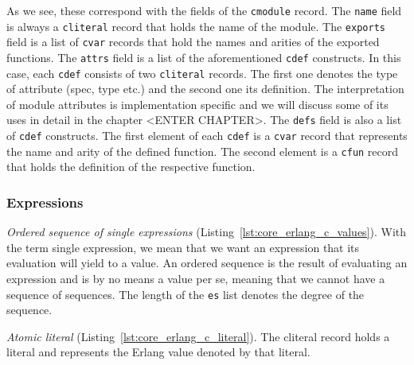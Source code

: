 As we see, these correspond with the fields of the \texttt{c\textunderscore module} record. The \texttt{name}
field is always a \texttt{c\textunderscore literal} record that holds the name of the module. The
\texttt{exports} field is a list of \texttt{c\textunderscore var} records that hold the names and arities of the
exported functions. The \texttt{attrs} field is a list of the aforementioned \texttt{c\textunderscore def}
constructs. In this case, each \texttt{c\textunderscore def} consists of two \texttt{c\textunderscore literal} records. The
first one denotes the type of attribute (spec, type etc.) and the second one
its definition. The interpretation of module attributes is implementation
specific and we will discuss some of its uses in detail in the chapter <ENTER CHAPTER>. The
\texttt{defs} field is also a list of \texttt{c\textunderscore def} constructs. The
first element of each \texttt{c\textunderscore def} is a \texttt{c\textunderscore var} record
that represents the name and arity of the defined function. The second element
is a \texttt{c\textunderscore fun} record that holds the definition of the respective
function.

\subsubsection{Expressions}


\emph{Ordered sequence of single expressions} (Listing~\ref{lst:core_erlang_c_values}).
With the term single expression, we mean that we want an expression that its
evaluation will yield to a value. An ordered sequence is the result of
evaluating an expression and is by no means a value per se, meaning that we
cannot have a sequence of sequences. The length of the \texttt{es} list denotes the
degree of the sequence.


\emph{Atomic literal} (Listing~\ref{lst:core_erlang_c_literal}).
The c\textunderscore literal record holds a  literal and represents the Erlang value denoted
by that literal.



